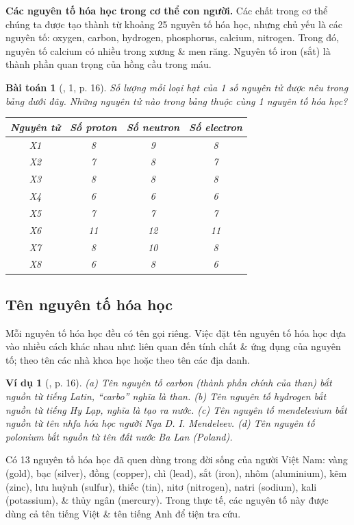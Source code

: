 \documentclass{article}
\newtheorem{baitoan}{Bài toán}
\newtheorem{vidu}{Ví dụ}
\begin{document}
\textbf{Các nguyên tố hóa học trong cơ thể con người.} Các chất trong cơ thể chúng ta được tạo thành từ khoảng 25 nguyên tố hóa học, nhưng chủ yếu là các nguyên tố: oxygen, carbon, hydrogen, phosphorus, calcium, nitrogen. Trong đó, nguyên tố calcium có nhiều trong xương \& men răng. Nguyên tố iron (sắt) là thành phần quan trọng của hồng cầu trong máu.

\begin{baitoan}[\cite{SGK_KHTN_7_Canh_Dieu}, 1, p. 16]
	Số lượng mỗi loại hạt của 1 số nguyên tử được nêu trong bảng dưới đây. Những nguyên tử nào trong bảng thuộc cùng 1 nguyên tố hóa học?
	\begin{table}[H]
		\centering
		\begin{tabular}{|c|c|c|c|}
			\hline
			Nguyên tử & Số proton & Số neutron & Số electron \\
			\hline
			X1 & 8 & 9 & 8 \\
			\hline
			X2 & 7 & 8 & 7 \\
			\hline
			X3 & 8 & 8 & 8 \\
			\hline
			X4 & 6 & 6 & 6 \\
			\hline
			X5 & 7 & 7 & 7 \\
			\hline
			X6 & 11 & 12 & 11 \\
			\hline
			X7 & 8 & 10 & 8 \\
			\hline
			X8 & 6 & 8 & 6 \\
			\hline
		\end{tabular}
	\end{table}
\end{baitoan}

\subsection{Tên nguyên tố hóa học}
Mỗi nguyên tố hóa học đều có tên gọi riêng. Việc đặt tên nguyên tố hóa học dựa vào nhiều cách khác nhau như: liên quan đến tính chất \& ứng dụng của nguyên tố; theo tên các nhà khoa học hoặc theo tên các địa danh.

\begin{vidu}[\cite{SGK_KHTN_7_Canh_Dieu}, p. 16]
	(a) Tên nguyên tố carbon (thành phần chính của than) bắt nguồn từ tiếng Latin, ``carbo'' nghĩa là than. (b) Tên nguyên tố hydrogen bắt nguồn từ tiếng Hy Lạp, nghĩa là tạo ra nước. (c) Tên nguyên tố mendelevium bắt nguồn từ tên nhfa hóa học người Nga D. I. Mendeleev. (d) Tên nguyên tố polonium bắt nguồn từ tên đất nước Ba Lan (Poland).
\end{vidu}
Có 13 nguyên tố hóa học đã quen dùng trong đời sống của người Việt Nam: vàng (gold), bạc (silver), đồng (copper), chì (lead), sắt (iron), nhôm (aluminium), kẽm (zinc), lưu huỳnh (sulfur), thiếc (tin), nitơ (nitrogen), natri (sodium), kali (potassium), \& thủy ngân (mercury). Trong thực tế, các nguyên tố này được dùng cả tên tiếng Việt \& tên tiếng Anh để tiện tra cứu.
\end{document}

